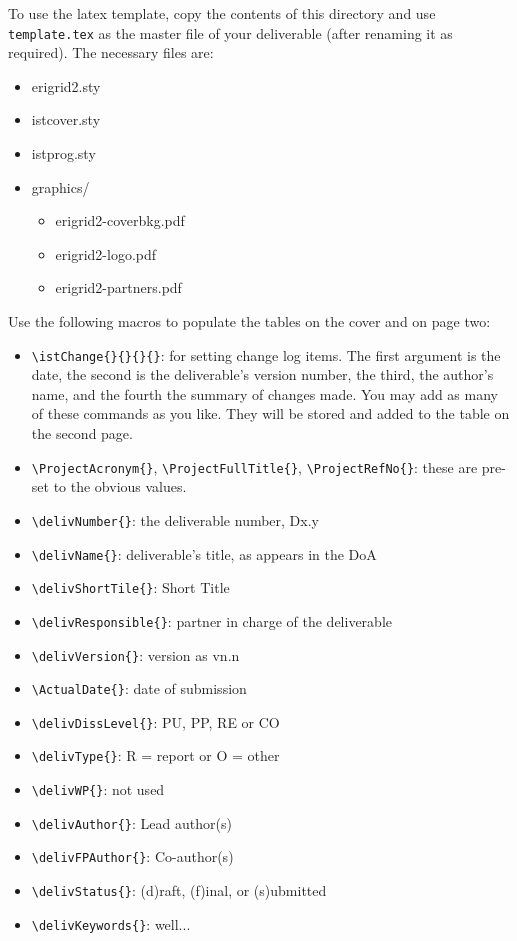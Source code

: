 \newcommand{\macro}[1]{{\tt \textbackslash #1}}

To use the latex template, copy the contents of this directory and use {\tt template.tex} as the master file of your deliverable (after renaming it as required). The necessary files are:

\begin{itemize}
    \item erigrid2.sty
    \item istcover.sty
    \item istprog.sty
    \item graphics/
    \begin{itemize}
        \item erigrid2-coverbkg.pdf
        \item erigrid2-logo.pdf
        \item erigrid2-partners.pdf
    \end{itemize}
\end{itemize}

Use the following macros to populate the tables on the cover and on page two:

\begin{itemize}
    \item \macro{istChange\{\}\{\}\{\}\{\}}: for setting change log items. The first argument is the date, the second is the deliverable's version number, the third, the author's name, and the   fourth the summary of changes made. You may add as many of these   commands as you like. They will be stored and added to the table on   the second page.  
    \item \macro{ProjectAcronym\{\}}, \macro{ProjectFullTitle\{\}}, \macro{ProjectRefNo\{\}}: these are pre-set to the obvious values. 
    \item \macro{delivNumber\{\}}: the deliverable number, Dx.y
    \item \macro{delivName\{\}}: deliverable's title, as appears in the DoA
    \item \macro{delivShortTile\{\}}: Short Title
    \item \macro{delivResponsible\{\}}: partner in charge of the deliverable
    \item \macro{delivVersion\{\}}: version as vn.n
    \item \macro{ActualDate\{\}}: date of submission
    \item \macro{delivDissLevel\{\}}: PU, PP, RE or CO
    \item \macro{delivType\{\}}: R = report or O = other
    \item \macro{delivWP\{\}}: not used
    \item \macro{delivAuthor\{\}}: Lead author(s)
    \item \macro{delivFPAuthor\{\}}: Co-author(s)
    \item \macro{delivStatus\{\}}: (d)raft, (f)inal, or (s)ubmitted
    \item \macro{delivKeywords\{\}}: well...
\end{itemize}

